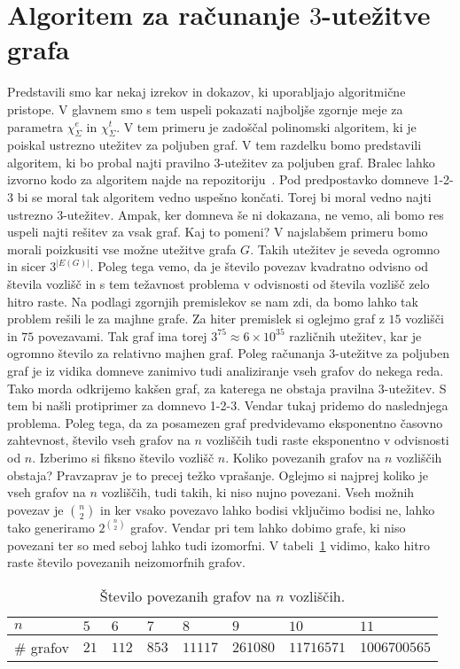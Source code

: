 \documentclass[12pt,a4paper,twoside]{article}
\theoremstyle{definition} %
\theoremstyle{plain} %
\newcommand{\ec}{\chi_{\Sigma}^e}
\newcommand{\ect}{\chi_{\Sigma}^t}
\numberwithin{equation}{section}  %
\begin{document}
\section{Algoritem za računanje $3$-utežitve grafa}
Predstavili smo kar nekaj izrekov in dokazov, ki uporabljajo algoritmične pristope. V glavnem smo s tem uspeli pokazati najboljše zgornje meje za parametra $\ec$ in $\ect$. V tem primeru je zadoščal polinomski algoritem, ki je poiskal ustrezno utežitev za poljuben graf. V tem razdelku bomo predstavili algoritem, ki bo probal najti pravilno $3$-utežitev za poljuben graf. Bralec lahko izvorno kodo za algoritem najde na repozitoriju~\cite{github}. Pod predpostavko domneve 1-2-3 bi se moral tak algoritem vedno uspešno končati. Torej bi moral vedno najti ustrezno $3$-utežitev. Ampak, ker domneva še ni dokazana, ne vemo, ali bomo res uspeli najti rešitev za vsak graf. Kaj to pomeni? V najslabšem primeru bomo morali poizkusiti vse možne utežitve grafa $G$. Takih utežitev je seveda ogromno in sicer $3^{|E(G)|}$. Poleg tega vemo, da je število povezav kvadratno odvisno od števila vozlišč in s tem težavnost problema v odvisnosti od števila vozlišč zelo hitro raste. Na podlagi zgornjih premislekov se nam zdi, da bomo lahko tak problem rešili le za majhne grafe. Za hiter premislek si oglejmo graf z $15$ vozlišči in $75$ povezavami. Tak graf ima torej $3^{75} \approx 6 \times 10^{35}$ različnih utežitev, kar je ogromno število za relativno majhen graf. Poleg računanja $3$-utežitve za poljuben graf je iz vidika domneve zanimivo tudi analiziranje vseh grafov do nekega reda. Tako morda odkrijemo kakšen graf, za katerega ne obstaja pravilna $3$-utežitev. S tem bi našli protiprimer za domnevo 1-2-3. Vendar tukaj pridemo do naslednjega problema. Poleg tega, da za posamezen graf predvidevamo eksponentno časovno zahtevnost, število vseh grafov na $n$ vozliščih tudi raste eksponentno v odvisnosti od $n$. Izberimo si fiksno število vozlišč $n$. Koliko povezanih grafov na $n$ vozliščih obstaja? Pravzaprav je to precej težko vprašanje. Oglejmo si najprej koliko je vseh grafov na $n$ vozliščih, tudi takih, ki niso nujno povezani. Vseh možnih povezav je $ {n \choose 2}$ in ker vsako povezavo lahko bodisi vključimo bodisi ne, lahko tako generiramo $2^{n \choose 2}$ grafov. Vendar pri tem lahko dobimo grafe, ki niso povezani ter so med seboj lahko tudi izomorfni. V tabeli~\ref{tbl:gnumb} vidimo, kako hitro raste število povezanih neizomorfnih grafov.
\begin{table}[h!]

\caption{Število povezanih grafov na $n$ vozliščih.}
\begin{tabular}{|l|l|l|l|l|l|l|l|}

\hline
\multicolumn{1}{|l|}{$n$} & $5$  & $6$   & $7$ & $8$ & $9$ & $10$ & $11$ \\ \hline
\# grafov                 & $21$ & $112$ & $853$  & $11117$  & $261080$  & $11716571$   & $1006700565$  \\ \hline
\end{tabular}

\label{tbl:gnumb}
\end{table}
\end{document}
